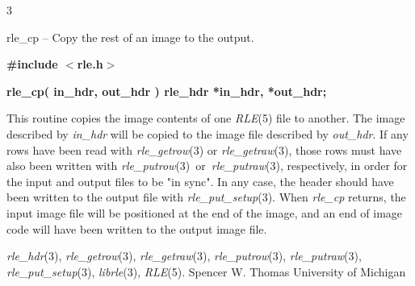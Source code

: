 %
%
%
 3

rle\_cp -- Copy the rest of an image to the output.

\bf
\#include $<$rle.h$>$
\par\vspace{1.0\baselineskip}
\bf
rle\_cp( in\_hdr, out\_hdr )
\nwl
\bf
rle\_hdr *in\_hdr, *out\_hdr;


This routine copies the image contents of one
{\it RLE}{\rm (5)}
file to another.
The image described by 
{\it in\_hdr}
will be copied to the image file described by
{\it out\_hdr}{\rm .}
If any rows have been read with
{\it rle\_getrow}{\rm (3)}
or
{\it rle\_getraw}{\rm (3),}
those rows must have also been written with
{\it rle\_putrow}{\rm (3)\ or\ }{\it rle\_putraw}{\rm (3),}
respectively,
in order for the input and output files to be "in sync".
In any case, the header should have been written to the output file with
{\it rle\_put\_setup}{\rm (3).}
When 
{\it rle\_cp}
returns, the input image file will be positioned at the end of the
image, and an end of image code will have been written to the output
image file.
\raggedright
{\it rle\_hdr}{\rm (3),}
{\it rle\_getrow}{\rm (3),}
{\it rle\_getraw}{\rm (3),}
{\it rle\_putrow}{\rm (3),}
{\it rle\_putraw}{\rm (3),}
{\it rle\_put\_setup}{\rm (3),}
{\it librle}{\rm (3),}
{\it RLE}{\rm (5).}
Spencer W. Thomas
\nwl
University of Michigan
\newpage


